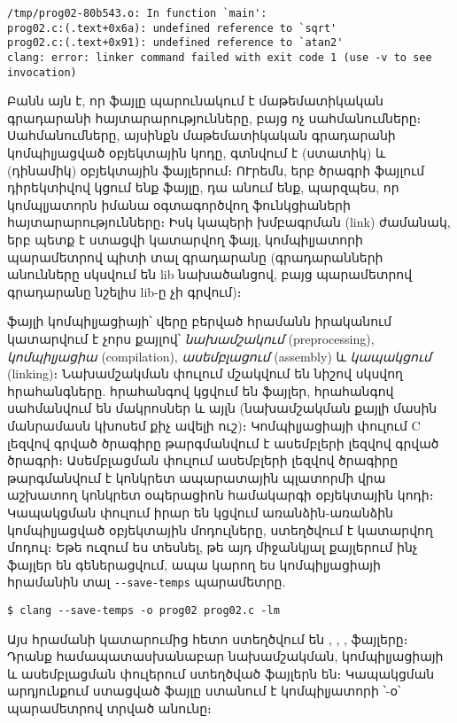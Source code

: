 \begin{verbatim}
/tmp/prog02-80b543.o: In function `main':
prog02.c:(.text+0x6a): undefined reference to `sqrt'
prog02.c:(.text+0x91): undefined reference to `atan2'
clang: error: linker command failed with exit code 1 (use -v to see invocation)
\end{verbatim}

Բանն այն է, որ  ֆայլը պարունակում է մաթեմատիկական
գրադարանի հայտարարությունները, բայց ոչ սահմանումները։ Սահմանումները,
այսինքն մաթեմատիկական գրադարանի կոմպիլյացված օբյեկտային կոդը, գտնվում է
 (ստատիկ) և  (դինամիկ) օբյեկտային
ֆայլերում։ ՈՒրեմն, երբ ծրագրի ֆայլում  դիրեկտիվով
կցում ենք  ֆայլը, դա անում ենք, պարզպես, որ կոմպլյատորն
իմանա օգտագործվող ֆունկցիաների հայտարարությունները։ Իսկ կապերի խմբագրման
(link) ժամանակ, երբ պետք է ստացվի կատարվող ֆայլ, կոմպիլյատորի
 պարամետրով պիտի տալ  գրադարանը (գրադարանների
անունները սկսվում են lib նախածանցով, բայց  պարամետրով
գրադարանը նշելիս lib-ը չի գրվում)։

 ֆայլի կոմպիլյացիայի՝ վերը բերված հրամանն իրականում
կատարվում է չորս քայլով՝ \emph{նախամշակում} (preprocessing),
\emph{կոմպիլյացիա} (compilation), \emph{ասեմբլացում} (assembly) և
\emph{կապակցում} (linking)։ Նախամշակման փուլում մշակվում են \code{\#}
նիշով սկսվող հրահանգները.  հրահանգով կցվում են ֆայլեր,
 հրահանգով սահմանվում են մակրոսներ և այլն (նախամշակման
քայլի մասին մանրամասն կխոսեմ քիչ ավելի ուշ)։ Կոմպիլյացիայի փուլում C
լեզվով գրված ծրագիրը թարգմանվում է ասեմբլերի լեզվով գրված ծրագրի։
Ասեմբլացման փուլում ասեմբլերի լեզվով ծրագիրը թարգմանվում է կոնկրետ
ապարատային պլատորմի վրա աշխատող կոնկրետ օպերացիոն համակարգի օբյեկտային
կոդի։ Կապակցման փուլում իրար են կցվում առանձին-առանձին կոմպիլյացված
օբյեկտային մոդուլները, ստեղծվում է կատարվող մոդուլ։ Եթե ուզում ես
տեսնել, թե այդ միջանկյալ քայլերում ինչ ֆայլեր են գեներացվում, ապա կարող
ես կոմպիլյացիայի հրամանին տալ \verb|--save-temps| պարամետրը.

\begin{verbatim}
$ clang --save-temps -o prog02 prog02.c -lm
\end{verbatim}

Այս հրամանի կատարումից հետո ստեղծվում են ,
, ,  ֆայլերը։ Դրանք
համապատասխանաբար նախամշակման, կոմպիլյացիայի և ասեմբլացման փուլերում
ստեղծված ֆայլերն են։ Կապակցման արդյունքում ստացված ֆայլը ստանում է
կոմպիլյատորի ՝-օ՝ պարամետրով տրված անունը։

